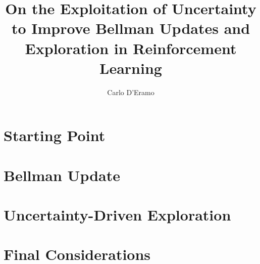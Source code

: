 \documentclass[10pt,twoside,openright,english,italian]{book}%
\author{Carlo D'Eramo}
\title{On the Exploitation of Uncertainty to Improve Bellman Updates and Exploration in Reinforcement Learning}
\begin{document}

\maketitle

\pagestyle{empty}

\cleardoublepage
\newpage

%

\cleardoublepage
\newpage

\pagestyle{fancy}
\setcounter{page}{1}





\tableofcontents
\cleardoublepage
\newpage

\listoffigures

\listofalgorithms

\printglossaries

\cleardoublepage

\setcounter{page}{1}
\part{Starting Point}

\part{Bellman Update}


\part{Uncertainty-Driven Exploration}


\part{Final Considerations}



\cleardoublepage
{}
{}
\small



\appendix

\end{document}
